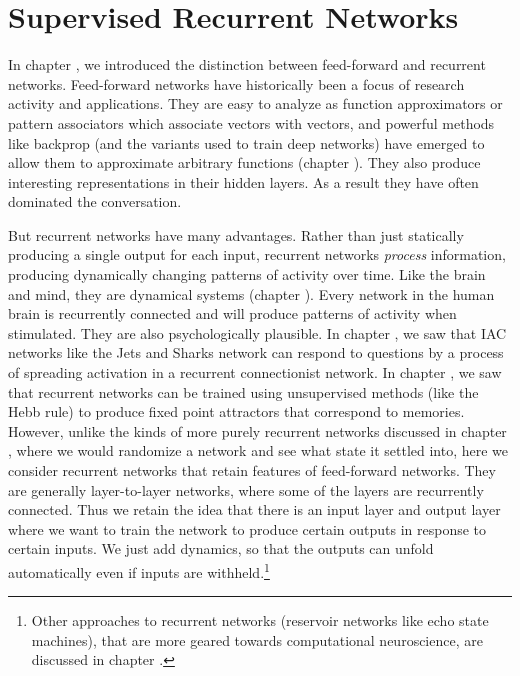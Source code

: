 \chapter{Supervised Recurrent Networks}\label{ch_supervised_recurrent}


In chapter , we introduced the distinction between feed-forward and recurrent networks. Feed-forward networks have historically been a focus of research activity and applications. They are easy to analyze as function approximators or pattern associators which  associate vectors with vectors, and powerful methods like backprop (and the variants used to train deep networks) have emerged to allow them to approximate arbitrary functions (chapter ). They also produce interesting representations in their hidden layers. As a result they have often dominated the conversation.

But recurrent networks have many advantages. Rather than just statically producing a single output for each input, recurrent networks \emph{process} information, producing dynamically changing patterns of activity over time. Like the brain and mind, they are dynamical systems (chapter ). Every network in the human brain is recurrently connected and will produce patterns of activity when stimulated. They are also psychologically plausible. In chapter , we saw that IAC networks like the Jets and Sharks network can respond to questions by a process of spreading activation in a recurrent connectionist network. In chapter , we saw that recurrent networks can be trained using unsupervised methods (like the Hebb rule) to produce fixed point attractors that correspond to memories. However, unlike the kinds of more purely recurrent networks discussed in chapter , where we would randomize a network and see what state it settled into, here we consider recurrent networks that retain features of feed-forward networks. They are generally layer-to-layer networks, where some of the layers are recurrently connected. Thus we retain the idea that there is an input layer and output layer where we want to train the network to produce certain outputs in response to certain inputs.  We just add dynamics, so that the outputs can unfold automatically even if inputs are withheld.\footnote{Other approaches to recurrent networks (reservoir networks like echo state machines), that are more geared towards computational neuroscience, are discussed in chapter .}

